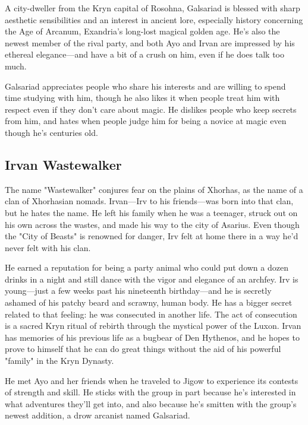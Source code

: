 \documentclass[a4paper, 11pt, bg=full, twocolumn, nooutline]{dndbook}
\begin{document}
A city-dweller from the Kryn capital of Rosohna, Galsariad is blessed with sharp aesthetic sensibilities and an interest in ancient lore, especially history concerning the Age of Arcanum, Exandria's long-lost magical golden age. He's also the newest member of the rival party, and both Ayo and Irvan are impressed by his ethereal elegance---and have a bit of a crush on him, even if he does talk too much.

Galsariad appreciates people who share his interests and are willing to spend time studying with him, though he also likes it when people treat him with respect even if they don't care about magic. He dislikes people who keep secrets from him, and hates when people judge him for being a novice at magic even though he's centuries old.

\subsection{Irvan Wastewalker}


The name "Wastewalker" conjures fear on the plains of Xhorhas, as the name of a clan of Xhorhasian nomads. Irvan---Irv to his friends---was born into that clan, but he hates the name. He left his family when he was a teenager, struck out on his own across the wastes, and made his way to the city of Asarius. Even though the "City of Beasts" is renowned for danger, Irv felt at home there in a way he'd never felt with his clan.

He earned a reputation for being a party animal who could put down a dozen drinks in a night and still dance with the vigor and elegance of an archfey. Irv is young---just a few weeks past his nineteenth birthday---and he is secretly ashamed of his patchy beard and scrawny, human body. He has a bigger secret related to that feeling: he was consecuted in another life. The act of consecution is a sacred Kryn ritual of rebirth through the mystical power of the Luxon. Irvan has memories of his previous life as a bugbear of Den Hythenos, and he hopes to prove to himself that he can do great things without the aid of his powerful "family" in the Kryn Dynasty.

He met Ayo and her friends when he traveled to Jigow to experience its contests of strength and skill. He sticks with the group in part because he's interested in what adventures they'll get into, and also because he's smitten with the group's newest addition, a drow arcanist named Galsariad.
\end{document}
